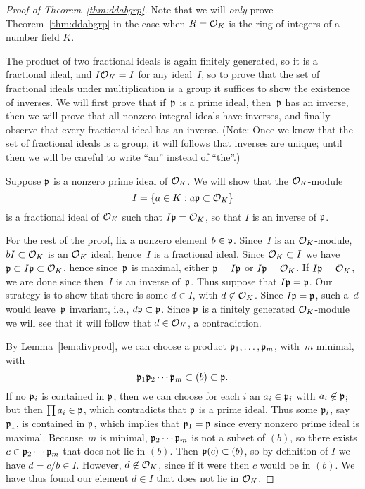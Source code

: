 \begin{proof}[Proof of Theorem~\ref{thm:ddabgrp}]
  Note that we will {\em only} prove Theorem~\ref{thm:ddabgrp} in the
  case when $R=\mathcal{O}_K$ is the ring of integers of a number field $K$.

	The product of two fractional ideals is again finitely generated, so
	it is a fractional ideal, and $I\mathcal{O}_K=I$ for any ideal~$I$,
	so to prove that the set of fractional ideals under multiplication is
	a group it suffices to show the existence of inverses.  We will first
	prove that if~$\mathfrak{p}$ is a prime ideal, then~$\mathfrak{p}$ has an inverse, then we
	will prove that all nonzero integral ideals have inverses, and finally
	observe that every fractional ideal has an inverse.  (Note: Once we
	know that the set of fractional ideals is a group, it will follows
	that inverses are unique; until then we will be careful to write
	``an'' instead of ``the''.)

	Suppose $\mathfrak{p}$ is a nonzero prime ideal of $\mathcal{O}_K$.   We will show that
	the $\mathcal{O}_K$-module
	$$
		I = \{a \in K : a\mathfrak{p} \subset \mathcal{O}_K \}
	$$
	is a fractional ideal of $\mathcal{O}_K$ such that $I\mathfrak{p} = \mathcal{O}_K$, so that
	$I$ is an inverse of $\mathfrak{p}$.

	For the rest of the proof, fix a nonzero element $b\in \mathfrak{p}$.  Since~$I$
	is an $\mathcal{O}_K$-module, $bI\subset \mathcal{O}_K$ is an $\mathcal{O}_K$ ideal, hence~$I$ is
	a fractional ideal.  Since $\mathcal{O}_K \subset I$ we have $\mathfrak{p} \subset I \mathfrak{p}
	\subset \mathcal{O}_K$, hence since~$\mathfrak{p}$ is maximal, either $\mathfrak{p} = I\mathfrak{p}$ or $I\mathfrak{p}
	= \mathcal{O}_K$.  If $I\mathfrak{p}=\mathcal{O}_K$, we are done since then~$I$ is an inverse
	of~$\mathfrak{p}$.  Thus suppose that $I\mathfrak{p}=\mathfrak{p}$.  Our strategy is to show that
	there is some $d\in I$, with $d\not\in\mathcal{O}_K$.  Since $I\mathfrak{p}=\mathfrak{p}$, such
	a~$d$ would leave~$\mathfrak{p}$ invariant, i.e., $d \mathfrak{p} \subset \mathfrak{p}$.  Since $\mathfrak{p}$
	is a finitely generated $\mathcal{O}_K$-module we will see that
	it will follow that $d\in \mathcal{O}_K$, a contradiction.

	By Lemma~\ref{lem:divprod}, we can choose a product $\mathfrak{p}_1,\ldots, \mathfrak{p}_m$,
	with~$m$ minimal, with
	$$
		\mathfrak{p}_1\mathfrak{p}_2\cdots \mathfrak{p}_m \subset (b) \subset \mathfrak{p}.
	$$ If no $\mathfrak{p}_i$ is contained in $\mathfrak{p}$, then we can choose for each $i$
	an $a_i \in \mathfrak{p}_i$ with $a_i\not\in \mathfrak{p}$; but then $\prod a_i\in \mathfrak{p}$,
	which contradicts that $\mathfrak{p}$ is a prime ideal.  Thus some $\mathfrak{p}_i$, say
	$\mathfrak{p}_1$, is contained in $\mathfrak{p}$, which implies that $\mathfrak{p}_1 = \mathfrak{p}$ since
	every nonzero prime ideal is maximal.  Because~$m$ is minimal,
	$\mathfrak{p}_2\cdots \mathfrak{p}_m$ is not a subset of $(b)$, so there exists $c\in
	\mathfrak{p}_2\cdots \mathfrak{p}_m$ that does not lie in $(b)$. Then $\mathfrak{p}(c) \subset (b)$,
	so by definition of $I$ we have $d=c/b\in I$.  However, $d\not\in
	\mathcal{O}_K$, since if it were then $c$ would be in $(b)$.  We have thus
	found our element $d\in I$ that does not lie in $\mathcal{O}_K$.
	

\end{proof}
